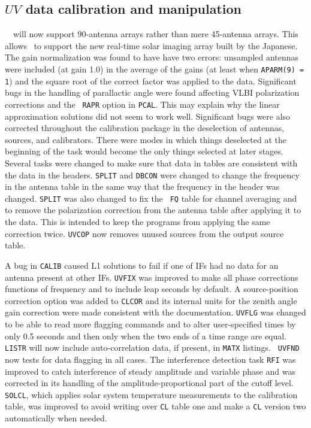 \subsection{$UV$ data calibration and manipulation}

\RELEASENAME\ \AIPS\ will now support 90-antenna arrays rather than
mere 45-antenna arrays.  This allows \AIPS\ to support the new
real-time solar imaging array built by the Japanese.  The gain
normalization was found to have have two errors: unsampled antennas
were included (at gain 1.0) in the average of the gains (at least when
{\tt APARM(9) = 1}) and the square root of the correct factor was
applied to the data.  Significant bugs in the handling of parallactic
angle were found affecting VLBI polarization corrections and the {\tt
RAPR} option in \hbox{{\tt PCAL}}.  This may explain why the linear
approximation solutions did not seem to work well.  Significant bugs
were also corrected throughout the calibration package in the
deselection of antennas, sources, and calibrators.  There were modes
in which things deselected at the beginning of the task would become
the only things selected at later stages.  Several tasks were changed
to make sure that data in tables are consistent with the data in the
headers.  {\tt SPLIT} and {\tt DBCON} were changed to change the
frequency in the antenna table in the same way that the frequency in
the header was changed.  {\tt SPLIT} was also changed to fix the {\tt
FQ} table for channel averaging and to remove the polarization
correction from the antenna table after applying it to the data.  This
is intended to keep the programs from applying the same correction
twice.  {\tt UVCOP} now removes unused sources from the output source
table.

A bug in {\tt CALIB} caused L1 solutions to fail if one of IFs had
no data for an antenna present at other IFs.  {\tt UVFIX} was improved
to make all phase corrections functions of frequency and to include
leap seconds by default.  A source-position correction option was
added to {\tt CLCOR} and its internal units for the zenith angle gain
correction were made consistent with the documentation.  {\tt UVFLG}
was changed to be able to read more flagging commands and to alter
user-specified times by only 0.5 seconds and then only when the two
ends of a time range are equal.  {\tt LISTR} will now include
auto-correlation data, if present, in {\tt MATX} listings.  {\tt
UVFND} now tests for data flagging in all cases.  The interference
detection task {\tt RFI} was improved to catch interference of steady
amplitude and variable phase and was corrected in its handling of the
amplitude-proportional part of the cutoff level.  {\tt SOLCL}, which
applies solar system temperature measurements to the calibration
table, was improved to avoid writing over {\tt CL} table one and make
a {\tt CL} version two automatically when needed.

